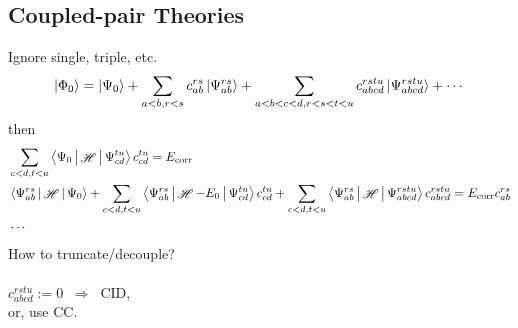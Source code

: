 \documentclass[a4paper]{article}
\DeclareMathOperator{\dra}{\;\Rightarrow\;}
\DeclareMathOperator{\sH}{\mathscr{H}}
\DeclareMathOperator{\corr}{\mathrm{corr}}
\numberwithin{equation}{section}
\begin{document}
\subsection{Coupled-pair Theories}
Ignore single, triple, etc.
\begin{equation}\label{key}
\ket{\Phi_0} = \ket{\Psi_0} + \sum_{a<b,r<s} c_{ab}^{rs} \ket{\Psi_{ab}^{rs}} + \sum_{a<b<c<d,r<s<t<u} c_{abcd}^{rstu} \ket{\Psi_{abcd}^{rstu}} + \cdots
\end{equation}
then
\begin{align}
& \sum_{c<d, t<u} \Braket{\Psi_0 | \sH | \Psi_{cd}^{tu}} c_{cd}^{tu} = E_{\corr} \label{Ecorr}\\
& \Braket{\Psi_{ab}^{rs} | \sH | \Psi_0} + \sum_{c<d, t<u} \Braket{\Psi_{ab}^{rs} | \sH - E_0 | \Psi_{cd}^{tu}} c_{cd}^{tu} + \sum_{c<d, t<u} \Braket{\Psi_{ab}^{rs} | \sH | \Psi_{abcd}^{rstu}} c_{abcd}^{rstu} = E_{\corr} c_{ab}^{rs} \notag\\
& \cdots
\end{align}
How to truncate/decouple?\\
~\\
$ c_{abcd}^{rstu} := 0 \; \dra $ CID,\\
or, use CC.
\end{document}
